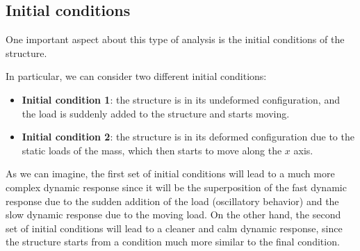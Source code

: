 \subsection{Initial conditions}
\label{subsec:initial_conditions}

One important aspect about this type of analysis is the initial conditions of the structure.

In particular, we can consider two different initial conditions:

\begin{itemize}
    \item \textbf{Initial condition 1}: the structure is in its undeformed configuration, and the load is suddenly added to the structure and starts moving.
    \item \textbf{Initial condition 2}: the structure is in its deformed configuration due to the static loads of the mass, which then starts to move along the $x$ axis.
\end{itemize}

As we can imagine, the first set of initial conditions will lead to a much more complex dynamic response since it will be the superposition of the fast dynamic response due to the sudden addition of the load (oscillatory behavior) and the slow dynamic response due to the moving load.
On the other hand, the second set of initial conditions will lead to a cleaner and calm dynamic response, since the structure starts from a condition much more similar to the final condition.